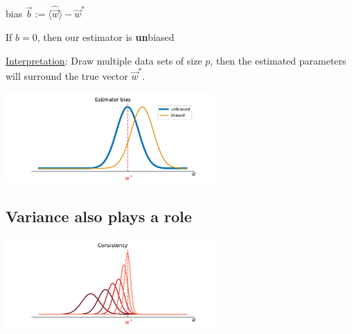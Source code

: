 \begin{frame}{\subsecname}

bias $\vec b := \langle \widehat{\vec w} \rangle - \vec w^*$

If $b=0$, then our estimator is \textbf{un}biased

\underline{Interpretation}: Draw multiple data sets of size $p$, then the estimated parameters will surround the true vector $\vec w^*$.

\begin{center}
	\includegraphics[width=0.6\textwidth]{img/bias.pdf}
\end{center}


\end{frame}

\subsection{Variance also plays a role}

\begin{frame}{\subsecname}

\begin{center}
	\includegraphics[width=0.6\textwidth]{img/consistency.pdf}
\end{center}

\end{frame}
